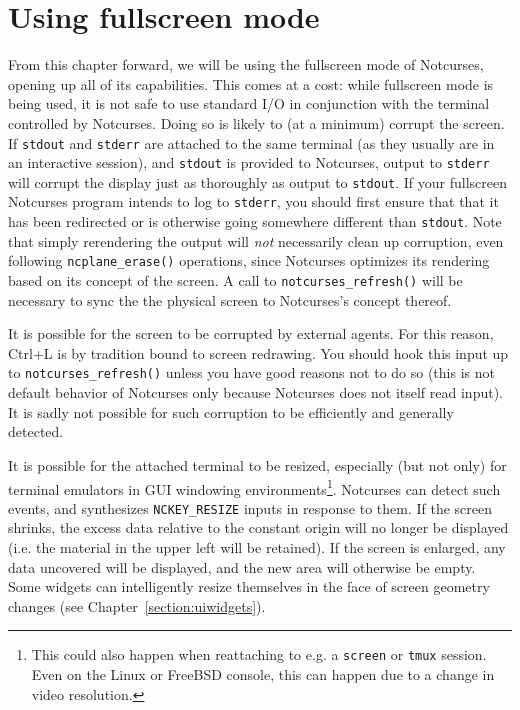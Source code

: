 \documentclass[letterpaper,10pt]{article}
\begin{document}
\section{Using fullscreen mode}
From this chapter forward, we will be using the fullscreen mode of Notcurses,
opening up all of its capabilities. This comes at a cost: while fullscreen mode
is being used, it is not safe to use standard I/O in conjunction with the
terminal controlled by Notcurses. Doing so is likely to (at a minimum) corrupt
the screen. If \texttt{stdout} and \texttt{stderr} are attached to the same
terminal (as they usually are in an interactive session), and \texttt{stdout}
is provided to Notcurses, output to \texttt{stderr} will corrupt the display
just as thoroughly as output to \texttt{stdout}. If your fullscreen Notcurses
program intends to log to \texttt{stderr}, you should first ensure that that
it has been redirected or is otherwise going somewhere different than
\texttt{stdout}. Note that simply rerendering the output will \textit{not}
necessarily clean up corruption, even following \texttt{ncplane\_erase()}
operations, since Notcurses optimizes its rendering based on its concept of the
screen. A call to \texttt{notcurses\_refresh()} will be necessary to sync the
the physical screen to Notcurses's concept thereof.

It is possible for the screen to be corrupted by external agents. For this
reason, Ctrl+L is by tradition bound to screen redrawing. You should hook this
input up to \texttt{notcurses\_refresh()} unless you have good reasons not to
do so (this is not default behavior of Notcurses only because Notcurses does
not itself read input). It is sadly not possible for such corruption to be
efficiently and generally detected.

It is possible for the attached terminal to be resized, especially (but not
only) for terminal emulators in GUI windowing environments\footnote{This could
also happen when reattaching to e.g. a \texttt{screen} or \texttt{tmux} session.
Even on the Linux or FreeBSD console, this can happen due to a change in video
resolution.}. Notcurses can detect such events, and synthesizes
\texttt{NCKEY\_RESIZE} inputs in response to them. If the screen shrinks, the
excess data relative to the constant origin will no longer be displayed (i.e.
the material in the upper left will be retained). If the screen is enlarged,
any data uncovered will be displayed, and the new area will otherwise be empty.
Some widgets can intelligently resize themselves in the face of screen
geometry changes (see Chapter~\ref{section:uiwidgets}).
\end{document}
